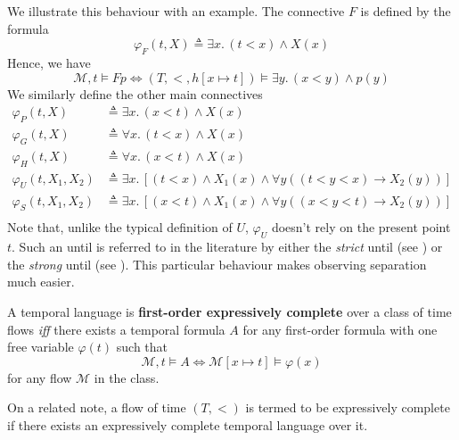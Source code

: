 \documentclass[a4paper,UKenglish,cleveref, autoref, thm-restate, numberwithinsect]{lipics-v2021}
\begin{document}
We illustrate this behaviour with an example. The connective $F$ is defined by the formula
\begin{equation*}
    \varphi_F(t, X) \triangleq \exists x.\, (t < x) \land X(x)
\end{equation*}
Hence, we have
\begin{equation*}
    \mathcal{M}, t \vDash F p \Longleftrightarrow (T, <, h[x \mapsto t]) \vDash \exists y.\, (x < y) \land p(y)
\end{equation*}
We similarly define the other main connectives
\begin{equation*}
    \begin{aligned}
        \varphi_P(t, X) &\triangleq \exists x.\, (x < t) \land X(x)\\
        \varphi_G(t, X) &\triangleq \forall x.\, (t < x) \land X(x)\\
        \varphi_H(t, X) &\triangleq \forall x.\, (x < t) \land X(x)\\
        \varphi_U(t, X_1, X_2) &\triangleq \exists x.\, \left[ \left( t < x \right) \land X_1(x) \land \forall y \left( \left( t < y < x \right) \to X_2(y) \right) \right]\\
        \varphi_S(t, X_1, X_2) &\triangleq \exists x.\, \left[ \left( x < t \right) \land X_1(x) \land \forall y \left( \left( x < y < t \right) \to X_2(y) \right) \right]\\
    \end{aligned}
\end{equation*}
Note that, unlike the typical definition of $U$, $\varphi_U$ doesn’t rely on the present point $t$. Such an until is referred to in the literature by either the \textit{strict} until (see \cite{gastinStrictUntil06}) or the \textit{strong} until (see \cite{BeCl16}). This particular behaviour makes observing separation much easier.

\begin{definition}
    \label{expressive-completeness-definition}
    A temporal language is \textbf{first-order expressively complete} over a class of time flows \textit{iff} there exists a temporal formula $A$ for any first-order formula with one free variable $\varphi(t)$ such that
\begin{equation*}
    \mathcal{M}, t \vDash A \Longleftrightarrow \mathcal{M}[x \mapsto t] \vDash \varphi(x)
\end{equation*}
    for any flow $\mathcal{M}$ in the class.
\end{definition}
On a related note, a flow of time $(T, <)$ is termed to be expressively complete if there exists an expressively complete temporal language over it.
\end{document}
